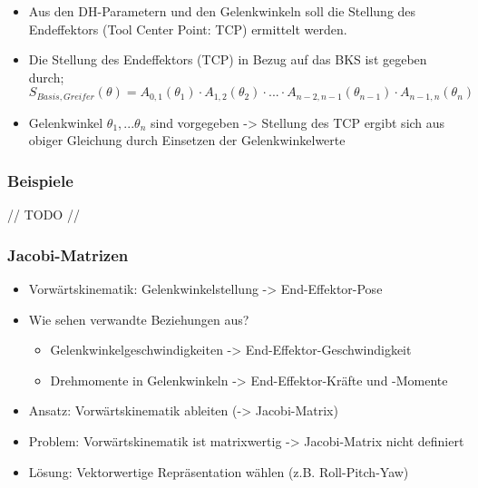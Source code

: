 \documentclass[paper=a4, fontsize=11pt]{scrartcl} %
\numberwithin{equation}{section} %
\numberwithin{figure}{section} %
\numberwithin{table}{section} %
\begin{document}
\begin{itemize}
\item Aus den DH-Parametern und den Gelenkwinkeln soll die Stellung des Endeffektors (Tool Center Point: TCP) ermittelt werden.
\item Die Stellung des Endeffektors (TCP) in Bezug auf das BKS ist gegeben durch; $S_{Basis,Greifer}(\theta) = A_{0,1}(\theta_1) \cdot A_{1,2} (\theta_2) \cdot ... \cdot A_{n-2,n-1}(\theta_{n-1}) \cdot A_{n-1,n}(\theta_n)$
\item Gelenkwinkel $\theta_1,...\theta_n$ sind vorgegeben -> Stellung des TCP ergibt sich aus obiger Gleichung durch Einsetzen der Gelenkwinkelwerte
\end{itemize}

\subsubsection{Beispiele}

// TODO //

\subsubsection{Jacobi-Matrizen}

\begin{itemize}
\item Vorwärtskinematik: Gelenkwinkelstellung -> End-Effektor-Pose
\item Wie sehen verwandte Beziehungen aus?
\begin{itemize}
\item Gelenkwinkelgeschwindigkeiten -> End-Effektor-Geschwindigkeit
\item Drehmomente in Gelenkwinkeln -> End-Effektor-Kräfte und -Momente
\end{itemize}
\item Ansatz: Vorwärtskinematik ableiten (-> Jacobi-Matrix)
\item Problem: Vorwärtskinematik ist matrixwertig -> Jacobi-Matrix nicht definiert
\item Lösung: Vektorwertige Repräsentation wählen (z.B. Roll-Pitch-Yaw)
\end{itemize}
\end{document}
